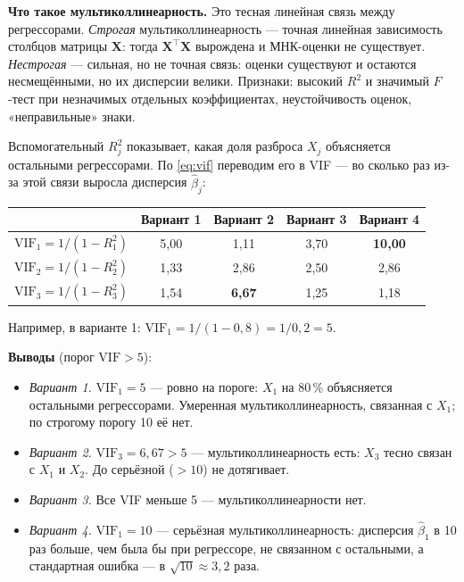 \begin{solution}
\textbf{Что такое мультиколлинеарность.} Это тесная линейная связь между
регрессорами. \emph{Строгая} мультиколлинеарность — точная линейная
зависимость столбцов матрицы $\mathbf{X}$: тогда
$\mathbf{X}^{\top}\mathbf{X}$ вырождена и МНК-оценки не существует.
\emph{Нестрогая} — сильная, но не точная связь: оценки существуют и остаются
несмещёнными, но их дисперсии велики. Признаки: высокий $R^2$ и значимый
$F$-тест при незначимых отдельных коэффициентах, неустойчивость оценок,
«неправильные» знаки.

Вспомогательный $R_j^2$ показывает, какая доля разброса $X_j$ объясняется
остальными регрессорами. По \eqref{eq:vif} переводим его в VIF —
во сколько раз из-за этой связи выросла дисперсия $\widehat{\beta}_j$:
\begin{center}
\begin{tabular}{ccccc}
\toprule
 & Вариант 1 & Вариант 2 & Вариант 3 & Вариант 4 \\
\midrule
$\mathrm{VIF}_1 = 1/(1 - R_1^2)$ & 5,00 & 1,11 & 3,70 & \textbf{10,00} \\
$\mathrm{VIF}_2 = 1/(1 - R_2^2)$ & 1,33 & 2,86 & 2,50 & 2,86 \\
$\mathrm{VIF}_3 = 1/(1 - R_3^2)$ & 1,54 & \textbf{6,67} & 1,25 & 1,18 \\
\bottomrule
\end{tabular}
\end{center}
Например, в варианте 1: $\mathrm{VIF}_1 = 1/(1 - 0{,}8) = 1/0{,}2 = 5$.

\textbf{Выводы} (порог $\mathrm{VIF} > 5$):
\begin{itemize}[leftmargin=2.2em, itemsep=2pt]
  \item \emph{Вариант 1.} $\mathrm{VIF}_1 = 5$ — ровно на пороге: $X_1$
        на 80\,\% объясняется остальными регрессорами. Умеренная
        мультиколлинеарность, связанная с $X_1$; по строгому порогу 10 её нет.
  \item \emph{Вариант 2.} $\mathrm{VIF}_3 = 6{,}67 > 5$ — мультиколлинеарность
        есть: $X_3$ тесно связан с $X_1$ и $X_2$. До серьёзной ($> 10$) не
        дотягивает.
  \item \emph{Вариант 3.} Все VIF меньше 5 — мультиколлинеарности нет.
  \item \emph{Вариант 4.} $\mathrm{VIF}_1 = 10$ — серьёзная
        мультиколлинеарность: дисперсия $\widehat{\beta}_1$ в 10 раз больше,
        чем была бы при регрессоре, не связанном с остальными, а стандартная
        ошибка — в $\sqrt{10} \approx 3{,}2$ раза.
\end{itemize}
\end{solution}


